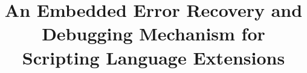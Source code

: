 \pagestyle{empty}

\setlength{\textheight}{9.0in}
\setlength{\columnsep}{0.25in}
\setlength{\textwidth}{6.45in}
\setlength{\footheight}{0.0in}
\setlength{\topmargin}{0.0in}
\setlength{\headheight}{0.0in}
\setlength{\headsep}{0.0in}
\setlength{\oddsidemargin}{0in}


\makeatletter
\def\@normalsize{\@setsize\normalsize{12pt}\xpt\@xpt
\abovedisplayskip 10pt plus2pt minus5pt\belowdisplayskip \abovedisplayskip
\abovedisplayshortskip \z@ plus3pt\belowdisplayshortskip 6pt plus3pt
minus3pt\let\@listi\@listI} 

\def\subsize{\@setsize\subsize{12pt}\xipt\@xipt}

\def\section{\@startsection {section}{1}{\z@}{24pt plus 2pt minus 2pt}
{12pt plus 2pt minus 2pt}{\large\bf}}

\def\subsection{\@startsection {subsection}{2}{\z@}{12pt plus 2pt minus 2pt}
{12pt plus 2pt minus 2pt}{\subsize\bf}}
\makeatother

\newcommand{\ignore}[1]{}



\date{}

\title{\Large \bf   An Embedded Error Recovery and Debugging Mechanism for Scripting Language Extensions}

